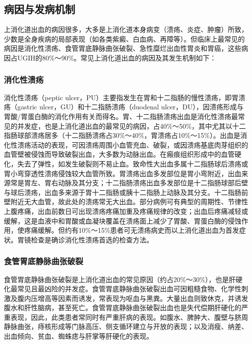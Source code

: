 \subsection{病因与发病机制}

上消化道出血的病因很多，大多是上消化道本身病变（溃疡、炎症、肿瘤）所致，少数是全身疾病的局部表现（如各类紫癜、白血病、再障等）。但临床上最常见的病因是消化性溃疡、食管胃底静脉曲张破裂、急性糜烂出血性胃炎和胃癌，这些病因占UGIH的80\%～90\%。常见上消化道出血的病因及其发生机制如下：

\subsubsection{消化性溃疡}

消化性溃疡（peptic
ulcer，PU）主要指发生在胃和十二指肠的慢性溃疡，即胃溃疡（gastric
ulcer，GU）和十二指肠溃疡（duodenal
ulcer，DU），因溃疡形成与胃酸/胃蛋白酶的消化作用有关而得名。胃、十二指肠溃疡出血是消化性溃疡最常见的并发症，也是上消化道出血的最常见的病因，占40\%～50\%，其中尤其以十二指肠球部溃疡居多（十二指肠溃疡占30\%～40\%，胃溃疡占10\%～15\%）。出血是消化性溃疡活动的表现，可因溃疡周围小血管充血、破裂，或因溃疡基底肉芽组织的血管壁被侵蚀而导致破裂出血，大多数为动脉出血。在瘢痕组织形成中的血管硬化，失去了弹性，如发生破裂则不易止血。致命性大出血多属十二指肠球后溃疡或胃小弯穿透性溃疡侵蚀较大血管所致。胃溃疡出血多发部位是胃小弯附近，出血来源常是胃左、胃右动脉及其分支；十二指肠溃疡出血多发部位是十二指肠球部后壁与球后溃疡，出血多来源于胃十二指肠或胰十二指肠上动脉及其分支。十二指肠前壁附近无大血管，故此处的溃疡常无大出血。部分病例可有典型的周期性、节律性上腹疼痛，出血前数日可出现溃疡疼痛加重及疼痛规律的改变；出血后疼痛减轻或缓解，这是血液中和胃酸或血凝块覆盖在溃疡面上减少了胃酸、胃蛋白酶的侵蚀作用，使疼痛缓解。但约有10\%～15\%患者可无溃疡病史而以上消化道出血为首发症状。胃镜检查是确诊消化性溃疡首选的检查方法。

\subsubsection{食管胃底静脉曲张破裂}

食管胃底静脉曲张破裂是上消化道出血的常见原因（约占20\%～30\%），也是肝硬化最常见且最凶险的并发症。食管胃底静脉曲张破裂出血可因粗糙食物、化学性刺激及腹内压增高等因素而诱发，常表现为呕血与黑粪。大量出血则致休克，并诱发腹水和肝性脑病，甚至死亡。食管胃底静脉曲张破裂出血也是失代偿期肝硬化的严重表现，因此，此类患者常同时有严重肝病的表现。如腹水、脾肿大、腹壁与脐周静脉曲张，痔核形成等门脉高压、侧支循环建立与开放的表现；以及消瘦、纳差、出血倾向、贫血、蜘蛛痣与肝掌等肝硬化的表现。

